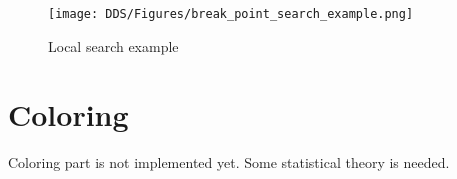 \begin{figure}[!h]
    \centering
    \texttt{[image: DDS/Figures/break\_point\_search\_example.png]}
    \caption{Local search example}
    \label{fig:break_point_search_example}
\end{figure}


\section{Coloring}
Coloring part is not implemented yet. Some statistical theory is needed.

\endinput